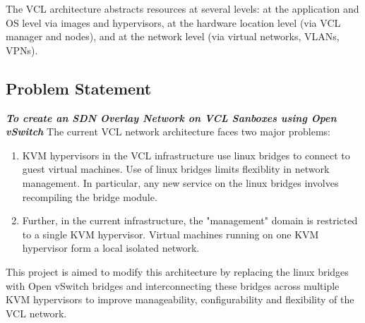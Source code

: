 \documentclass[12pt]{extarticle}
\begin{document}
The VCL architecture abstracts resources at several levels: at the application and OS level via images and hypervisors, at the hardware location level (via VCL manager and nodes), and at the network level (via virtual networks, VLANs, VPNs).

\subsection{Problem Statement}

\textbf{\emph{To create an SDN Overlay Network on VCL Sanboxes using Open vSwitch}}
\newline
The current VCL network architecture faces two major problems:
\begin{enumerate}
    \item KVM hypervisors in the VCL infrastructure use linux bridges to connect to guest virtual machines. Use of linux bridges limits flexiblity in network management. In particular, any new service on the linux bridges involves recompiling the bridge module.
    \item Further, in the current infrastructure, the "management" domain is restricted to a single KVM hypervisor. Virtual machines running on one KVM hypervisor form a local isolated network.
\end{enumerate}
  This project is aimed to modify this architecture by replacing the linux bridges with Open vSwitch bridges and interconnecting these bridges across multiple KVM hypervisors to improve manageability, configurability and flexibility of the VCL network.  


\end{document}
